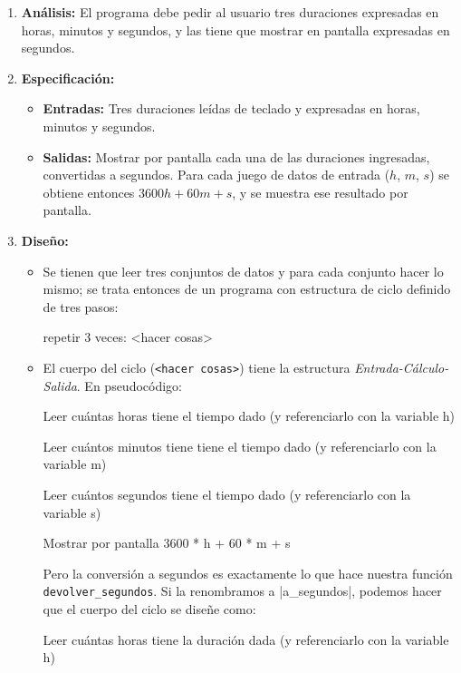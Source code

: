 \begin{enumerate}

\item {\bf Análisis: } El programa debe pedir al usuario tres duraciones
    expresadas en horas, minutos y segundos, y las tiene que mostrar en
    pantalla expresadas en segundos.

\item {\bf Especificación: }
\begin{itemize}
\item {\bf Entradas: } Tres duraciones leídas de teclado y expresadas en horas,
minutos y segundos.
\item {\bf Salidas: } Mostrar por pantalla cada una de las duraciones
    ingresadas, convertidas a segundos.  Para cada juego de datos de entrada
    ($h$, $m$, $s$) se obtiene entonces $3600 h + 60 m + s$, y se muestra
    ese resultado por pantalla.
\end{itemize}

\item {\bf Diseño:}
\begin{itemize}
\item Se tienen que leer tres conjuntos de datos y para cada conjunto hacer lo
mismo; se trata entonces de un programa con estructura de ciclo definido de
tres pasos:

\begin{codigo-nohl-sn}
repetir 3 veces:
    <hacer cosas>
\end{codigo-nohl-sn}

\item El cuerpo del ciclo (\verb+<hacer cosas>+) tiene la estructura {\it
Entrada-Cálculo-Salida}.  En pseudocódigo:

\begin{codigo-nohl-sn}
Leer cuántas horas tiene el tiempo dado
 (y referenciarlo con la variable h)

Leer cuántos minutos tiene tiene el tiempo dado
 (y referenciarlo con la variable m)

Leer cuántos segundos tiene el tiempo dado
 (y referenciarlo con la variable s)

Mostrar por pantalla 3600 * h + 60 * m + s
\end{codigo-nohl-sn}

Pero la conversión a segundos es exactamente lo que hace nuestra función
\verb+devolver_segundos+. Si la renombramos a |a_segundos|, podemos hacer que
el cuerpo del ciclo se diseñe como:

\begin{codigo-nohl-sn}
Leer cuántas horas tiene la duración dada
 (y referenciarlo con la variable h)


\end{codigo-nohl-sn}
\end{itemize}
\end{enumerate}
